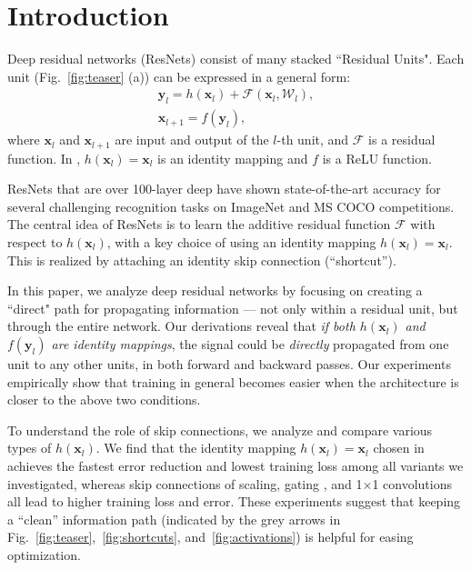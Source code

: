 \documentclass[runningheads]{llncs}
\newcommand{\ve}[1]{\mathbf{#1}} %
\begin{document}
\section{Introduction}
Deep residual networks (ResNets) \cite{He2016} consist of many stacked ``Residual Units". Each unit (Fig.~\ref{fig:teaser} (a)) can be expressed in a general form:
\begin{gather}
\ve{y}_{l} = h(\ve{x}_{l}) + \mathcal{F}(\ve{x}_{l}, \mathcal{W}_l), \nonumber\\
\ve{x}_{l+1} = f(\ve{y}_{l}) \nonumber,
\end{gather}
where $\ve{x}_{l}$ and $\ve{x}_{l+1}$ are input and output of the $l$-th unit, and $\mathcal{F}$ is a residual function. In \cite{He2016}, $h(\ve{x}_{l}) = \ve{x}_{l}$ is an identity mapping and $f$ is a ReLU \cite{Nair2010} function.

ResNets that are over 100-layer deep have shown state-of-the-art accuracy for several challenging recognition tasks on ImageNet \cite{Russakovsky2015} and MS COCO \cite{Lin2014} competitions. The central idea of ResNets is to learn the additive residual function $\mathcal{F}$ with respect to $h(\ve{x}_{l})$, with a key choice of using an identity mapping $h(\ve{x}_{l}) = \ve{x}_{l}$. This is realized by attaching an identity skip connection (``shortcut'').

In this paper, we analyze deep residual networks by focusing on creating a ``direct" path for propagating information --- not only within a residual unit, but through the entire network. Our derivations reveal that \emph{if both $h(\ve{x}_{l})$ and $f(\ve{y}_{l})$ are identity mappings}, the signal could be \emph{directly} propagated from one unit to any other units, in both forward and backward passes. Our experiments empirically show that training in general becomes easier when the architecture is closer to the above two conditions.

To understand the role of skip connections, we analyze and compare various types of $h(\ve{x}_{l})$. We find that the identity mapping $h(\ve{x}_{l}) = \ve{x}_{l}$ chosen in \cite{He2016} achieves the fastest error reduction and lowest training loss among all variants we investigated, whereas skip connections of scaling, gating \cite{Hochreiter1997,Srivastava2015,Srivastava2015a}, and 1$\times$1 convolutions all lead to higher training loss and error. These experiments suggest that keeping a ``clean'' information path (indicated by the grey arrows in Fig.~\ref{fig:teaser},~\ref{fig:shortcuts}, and~\ref{fig:activations}) is helpful for easing optimization.
\end{document}
